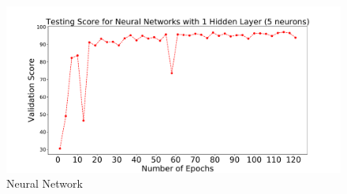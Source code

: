 \begin{figure}[h]
\includegraphics[width=\onepic\textwidth]{plots/epochsvsscore1_10seeds_1layer_5.pdf}
\caption{
Neural Network
}
\label{fig:Maps_data}
\end{figure}	



